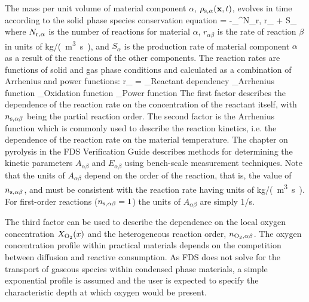 The mass per unit volume of material component $\alpha$, $\rho_{\rm s,\alpha}({\mathbf{x}},t)$, evolves in time according to the solid phase species conservation equation
\be
    = -\sum_{}^{N_{\rm r,\alpha}} r_{\alpha \beta} + S_\alpha
  \label{solid_species_conservation}
\ee
where $N_{\rm r,\alpha}$ is the number of reactions for material $\alpha$, $r_{\alpha \beta}$ is the rate of reaction $\beta$ in units of \unit{kg/(m^3.s)}, and $S_\alpha$ is the production rate of material component $\alpha$ as a result of the reactions of the other components. The reaction rates are functions of solid and gas phase conditions and calculated as a combination of Arrhenius and power functions:
\be
r_{\alpha \beta} =
    _\textrm{Reactant dependency}
    _\textrm{Arrhenius function}
    _\textrm{Oxidation function}
    _\textrm{Power function}
   \label{Arrhenius}
\ee
The first factor describes the dependence of the reaction rate on the concentration of the reactant itself, with $n_{\rm s,\alpha\beta}$ being the partial reaction order. The second factor is the Arrhenius function which is commonly used to describe the reaction kinetics, i.e. the dependence of the reaction rate on the material temperature. The chapter on pyrolysis in the FDS Verification Guide describes methods for determining the kinetic parameters $A_{\alpha \beta}$ and $E_{\alpha\beta}$ using bench-scale measurement techniques.  Note that the units of $A_{\alpha \beta}$ depend on the order of the reaction, that is, the value of $n_{\rm s,\alpha\beta}$, and must be consistent with the reaction rate having units of \unit{kg/(m^3.s)}.  For first-order reactions ($n_{\rm s,\alpha\beta}=1$) the units of $A_{\alpha \beta}$ are simply 1/s.

The third factor can be used to describe the dependence on the local oxygen concentration $X_{\rm O_2}(x)$ and the heterogeneous reaction order, $n_{\rm O_2,\alpha\beta}$. The oxygen concentration profile within practical materials depends on the competition between diffusion and reactive consumption. As FDS does not solve for the transport of gaseous species within condensed phase materials, a simple exponential profile is assumed and the user is expected to specify the characteristic depth at which oxygen would be present.

